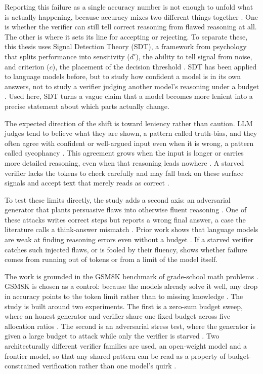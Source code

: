 \documentclass[12pt, a4paper, oneside]{report}
\begin{document}
Reporting this failure as a single accuracy number is not enough to unfold what is actually happening, because accuracy mixes two different things together \parencite{Cacioli2026}. One is whether the verifier can still tell correct reasoning from flawed reasoning at all. The other is where it sets its line for accepting or rejecting. To separate these, this thesis uses Signal Detection Theory (SDT), a framework from psychology that splits performance into sensitivity ($d'$), the ability to tell signal from noise, and criterion ($c$), the placement of the decision threshold \parencite{Cacioli2026}. SDT has been applied to language models before, but to study how confident a model is in its own answers, not to study a verifier judging another model's reasoning under a budget \parencite{Cacioli2026}. Used here, SDT turns a vague claim that a model becomes more lenient into a precise statement about which parts actually change.

The expected direction of the shift is toward leniency rather than caution. LLM judges tend to believe what they are shown, a pattern called truth-bias, and they often agree with confident or well-argued input even when it is wrong, a pattern called sycophancy \parencite{Fanous2025, Barkett2025}. This agreement grows when the input is longer or carries more detailed reasoning, even when that reasoning leads nowhere \parencite{Kim2025}. A starved verifier lacks the tokens to check carefully and may fall back on these surface signals and accept text that merely reads as correct \parencite{Agrawal2026}.

To test these limits directly, the study adds a second axis: an adversarial generator that plants persuasive flaws into otherwise fluent reasoning \parencite{Juneja2025}. One of these attacks writes correct steps but reports a wrong final answer, a case the literature calls a think-answer mismatch \parencite{Shen2025}. Prior work shows that language models are weak at finding reasoning errors even without a budget \parencite{Stechly2024}. If a starved verifier catches such injected flaws, or is fooled by their fluency, shows whether failure comes from running out of tokens or from a limit of the model itself.

The work is grounded in the GSM8K benchmark of grade-school math problems \parencite{Zhuang2026}. GSM8K is chosen as a control: because the models already solve it well, any drop in accuracy points to the token limit rather than to missing knowledge \parencite{Zhang2025tts}. The study is built around two experiments. The first is a zero-sum budget sweep, where an honest generator and verifier share one fixed budget across five allocation ratios \parencite{Singhi2025}. The second is an adversarial stress test, where the generator is given a large budget to attack while only the verifier is starved \parencite{Juneja2025}. Two architecturally different verifier families are used, an open-weight model and a frontier model, so that any shared pattern can be read as a property of budget-constrained verification rather than one model's quirk \parencite{Snell2024}.
\end{document}
